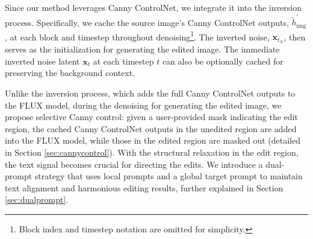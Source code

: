 \documentclass{article}
\newenvironment{cyanpar}{\color{cyan}}{}
\begin{document}
\begin{cyanpar}
%


Since our method leverages Canny ControlNet, we integrate it into the inversion process. Specifically, we cache the source image's Canny ControlNet outputs, $\tilde{h}^{\prime}_{\text{img}}$, at each block and timestep throughout denoising\footnote{Block index and timestep notation are omitted for simplicity.}. The inverted noise, $\mathbf{x}_{t_N}$, then serves as the initialization for generating the edited image. The immediate inverted noise latent $\mathbf{x}_t$ at each timestep $t$ can also be optionally cached for preserving the background context.  


Unlike the inversion process, which adds the full Canny ControlNet outputs to the FLUX model, during the denoising for generating the edited image, we propose selective Canny control: given a user-provided mask indicating the edit region, the cached Canny ControlNet outputs in the unedited region are added into the FLUX model, while those in the edited region are masked out (detailed in Section \ref{sec:cannycontrol}). With the structural relaxation in the edit region, the text signal becomes crucial for directing the edits. We introduce a dual-prompt strategy that uses local prompts and a global target prompt to maintain text alignment and harmonious editing results, further explained in Section \ref{sec:dualprompt}.


\end{cyanpar}
\end{document}
